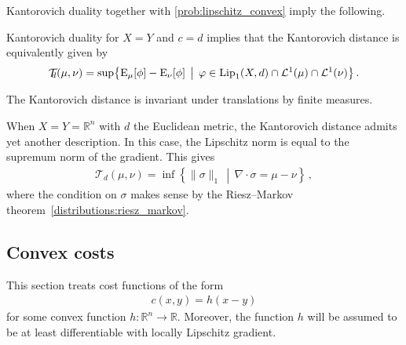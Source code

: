     Kantorovich duality together with \cref{prob:lipschitz_convex} imply the following.
    \begin{theorem}
        Kantorovich duality for $X=Y$ and $c=d$ implies that the Kantorovich distance is equivalently given by
        \begin{gather}
            \mathcal{T}_{\!\!d}(\mu,\nu) = \sup\bigl\{\mathrm{E}_\mu[\phi]-\mathrm{E}_\nu[\phi]\,\bigm\vert\,\varphi\in\mathrm{Lip}_1(X,d)\cap\mathcal{L}^1(\mu)\cap\mathcal{L}^1(\nu)\bigr\}\,.
        \end{gather}
    \end{theorem}

    \begin{property}
        The Kantorovich distance is invariant under translations by finite measures.
    \end{property}

    \begin{property}
        When $X=Y=\mathbb{R}^n$ with $d$ the Euclidean metric, the Kantorovich distance admits yet another description. In this case, the Lipschitz norm is equal to the supremum norm of the gradient. This gives
        \begin{gather}
            \mathcal{T}_{\!\!d}(\mu,\nu) = \inf\left\{\|\sigma\|_1\,\middle\vert\,\nabla\cdot\sigma=\mu-\nu\right\}\,,
        \end{gather}
        where the condition on $\sigma$ makes sense by the Riesz--Markov theorem~\ref{distributions:riesz_markov}.
    \end{property}

\subsection{Convex costs}

    This section treats cost functions of the form
    \begin{gather}
        c(x,y) = h(x-y)
    \end{gather}
    for some convex function $h:\mathbb{R}^n\rightarrow\mathbb{R}$. Moreover, the function $h$ will be assumed to be at least differentiable with locally Lipschitz gradient.


